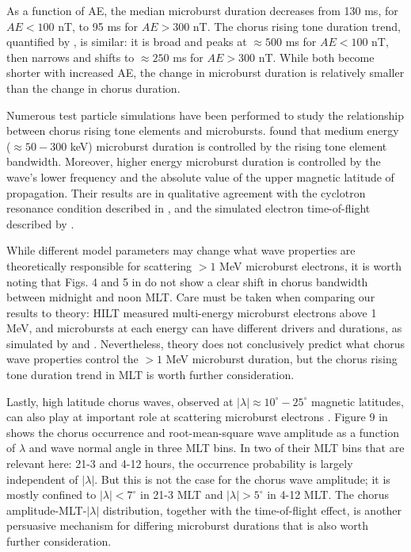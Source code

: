\documentclass[draft]{agujournal2019}
\begin{document}
As a function of AE, the median microburst duration decreases from 130 ms, for $AE < 100$ nT, to 95 ms for $AE > 300$ nT. The chorus rising tone duration trend, quantified by , is similar: it is broad and peaks at $\approx 500$ ms for $AE < 100$ nT, then narrows and shifts to $\approx 250$ ms for $AE > 300$ nT. While both become shorter with increased AE, the change in microburst duration is relatively smaller than the change in chorus duration.

Numerous test particle simulations have been performed to study the relationship between chorus rising tone elements and microbursts.  found that medium energy ($\approx 50-300$ keV) microburst duration is controlled by the rising tone element bandwidth. Moreover, higher energy microburst duration is controlled by the wave's lower frequency and the absolute value of the upper magnetic latitude of propagation. Their results are in qualitative agreement with the cyclotron resonance condition described in , and the simulated electron time-of-flight described by .

While different model parameters may change what wave properties are theoretically responsible for scattering $>1$ MeV microburst electrons, it is worth noting that Figs. 4 and 5 in  do not show a clear shift in chorus bandwidth between midnight and noon MLT. Care must be taken when comparing our results to theory: HILT measured multi-energy microburst electrons above 1 MeV, and microbursts at each energy can have different drivers and durations, as simulated by  and . Nevertheless, theory does not conclusively predict what chorus wave properties control the $> 1$ MeV microburst duration, but the chorus rising tone duration trend in MLT is worth further consideration. 

Lastly, high latitude chorus waves, observed at $|\lambda| \approx 10^\circ-25^\circ$ magnetic latitudes, can also play at important role at scattering microburst electrons \cite{Lorentzen2001a}. Figure 9 in  shows the chorus occurrence and root-mean-square wave amplitude as a function of $\lambda$ and wave normal angle in three MLT bins. In two of their MLT bins that are relevant here: 21-3 and 4-12 hours, the occurrence probability is largely independent of $|\lambda|$. But this is not the case for the chorus wave amplitude; it is mostly confined to $|\lambda| < 7^\circ$ in 21-3 MLT and $|\lambda| > 5^\circ$ in 4-12 MLT. The chorus amplitude-MLT-$|\lambda|$ distribution, together with the time-of-flight effect, is another persuasive mechanism for differing microburst durations that is also worth further consideration. 
\end{document}

